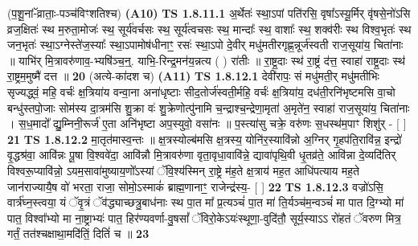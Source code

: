 \documentclass[17pt]{extarticle}
\begin{document}
                  \newline
                      (प॒शू॒नां-ॅव्राताः॒-पञ्च॑विꣳशतिश्च)  \textbf{(A10)} \newline \newline
                                        \textbf{ TS 1.8.11.1} \newline
                  अ॒र्थेतः॑ स्था॒ऽपां पति॑रसि॒ वृषा᳚ऽस्यू॒र्मिर् वृ॑षसे॒नो॑ऽसि व्रज॒क्षितः॑ स्थ म॒रुता॒मोजः॑ स्थ॒ सूर्य॑वर्चसः स्थ॒ सूर्य॑त्वचसः स्थ॒ मान्दाः᳚ स्थ॒ वाशाः᳚ स्थ॒ शक्व॑रीः स्थ विश्व॒भृतः॑ स्थ जन॒भृतः॑ स्था॒ऽग्नेस्ते॑ज॒स्याः᳚ स्था॒ऽपामोष॑धीनाꣳ॒॒ रसः॑ स्था॒ऽपो दे॒वीर् मधु॑मतीरगृह्ण॒न्नूर्ज॑स्वती राज॒सूया॑य॒ चिता॑नाः ॥ याभि॑र् मि॒त्रावरु॑णाव॒-भ्यषि॑ञ्च॒न्॒. याभि॒-रिन्द्र॒मन॑य॒न्नत्य ( ) रा॑तीः ॥ रा॒ष्ट्र॒दाः स्थ॑ रा॒ष्ट्रं द॑त्त॒ स्वाहा॑ राष्ट्र॒दाः स्थ॑ रा॒ष्ट्रम॒मुष्मै॑ दत्त ॥ \textbf{  20 } \newline
                  \newline
                      (अत्ये-का॑दश च)  \textbf{(A11)} \newline \newline
                                        \textbf{ TS 1.8.12.1} \newline
                  देवी॑रापः॒ सं मधु॑मती॒र् मधु॑मतीभिः सृज्यद्ध्वं॒ महि॒ वर्चः॑ क्ष॒त्रिया॑य वन्वा॒ना अना॑धृष्टाः सीद॒तोर्ज॑स्वती॒र्महि॒ वर्चः॑ क्ष॒त्रिया॑य॒ दध॑ती॒रनि॑भृष्टमसि वा॒चो बन्धु॑स्तपो॒जाः सोम॑स्य दा॒त्रम॑सि शु॒क्रा वः॑ शु॒क्रेणोत्पु॑नामि च॒न्द्राश्च॒न्द्रेणा॒मृता॑ अ॒मृते॑न॒ स्वाहा॑ राज॒सूया॑य॒ चिता॑नाः । स॒ध॒मादो᳚ द्यु॒म्निनी॒रूर्ज॑ ए॒ता अनि॑भृष्टा अप॒स्युवो॒ वसा॑नः ॥ प॒स्त्या॑सु चक्रे॒ वरु॑णः स॒धस्थ॑म॒पाꣳ शिशु॑र् - [ ] \textbf{  21} \newline
                  \newline
                                \textbf{ TS 1.8.12.2} \newline
                  मा॒तृत॑मास्व॒न्तः ॥ क्ष॒त्रस्योल्ब॑मसि क्ष॒त्रस्य॒ योनि॑र॒स्यावि॑न्नो अ॒ग्निर् गृ॒हप॑ति॒रावि॑न्न॒ इन्द्रो॑ वृ॒द्धश्र॑वा॒ आवि॑न्नः पू॒षा वि॒श्ववे॑दा॒ आवि॑न्नौ मि॒त्रावरु॑णा वृता॒वृधा॒वावि॑न्ने॒ द्यावा॑पृथि॒वी धृ॒तव्र॑ते॒ आवि॑न्ना दे॒व्यदि॑तिर् विश्वरू॒प्यावि॑न्नो॒ ऽयम॒सावा॑मुष्याय॒णो᳚ऽस्यां ॅवि॒श्य॑स्मिन् रा॒ष्ट्रे म॑ह॒ते क्ष॒त्राय॑ मह॒त आधि॑पत्याय मह॒ते जान॑राज्यायै॒ष वो॑ भरता॒ राजा॒ सोमो॒ऽस्माकं॑ ब्राह्म॒णानाꣳ॒॒ राजेन्द्र॑स्य॒- [ ] \textbf{  22} \newline
                  \newline
                                \textbf{ TS 1.8.12.3} \newline
                  वज्रो॑ऽसि॒ वार्त्र॑घ्न॒स्त्वया॒ यं ॅवृ॒त्रं ॅव॑द्ध्याच्छत्रु॒बाध॑नाः स्थ पा॒त मा᳚ प्र॒त्यञ्चं॑ पा॒त मा॑ ति॒र्यञ्च॑म॒न्वञ्चं॑ मा पात दि॒ग्भ्यो मा॑ पात॒ विश्वा᳚भ्यो मा ना॒ष्ट्राभ्यः॑ पात॒ हिर॑ण्यवर्णा-वु॒षसां᳚ ॅविरो॒केऽयः॑स्थूणा॒-वुदि॑तौ॒ सूर्य॒स्याऽऽ रो॑हतं ॅवरुण मित्र॒ गर्तं॒ तत॑श्चक्षाथा॒मदि॑तिं॒ दितिं॑ च ॥ \textbf{  23} \newline
\end{document}
